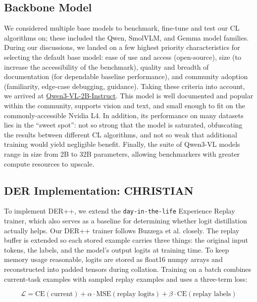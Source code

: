 \documentclass{article}
\begin{document}
\subsection{Backbone Model}
We considered multiple base models to benchmark, fine-tune and test our CL algorithms on; these included the
Qwen, SmolVLM, and Gemma model families. During our discussions, we landed on a few highest priority
characteristics for selecting the default base model: ease of use and access (open-source), size (to increase
the accessibility of the benchmark), quality and breadth of documentation (for dependable baseline
performance), and community adoption (familiarity, edge-case debugging, guidance). Taking these criteria into
account, we arrived at \href{https://huggingface.co/Qwen/Qwen3-VL-2B-Instruct}{Qwen3-VL-2B-Instruct}. This
model is well documented and popular within the community, supports vision and text, and small enough to fit
on the commonly-accessible Nvidia L4. In addition, its performance on many datasets lies in the ``sweet
spot'': not so strong that the model is saturated, obfuscating the results between different CL algorithms,
and not so weak that additional training would yield negligible benefit. Finally, the suite of Qwen3-VL
models range in size from 2B to 32B parameters, allowing benchmarkers with greater compute resources to upscale.

\subsection{DER Implementation: CHRISTIAN}
To implement DER++, we extend the \texttt{day-in-the-life} Experience Replay
trainer, which also serves as a baseline for determining whether logit
distillation actually helps. Our DER++ trainer follows Buzzega et al.
\cite{der} closely. The replay buffer is extended so each stored example
carries three things: the original input tokens, the labels, and the model's
output logits at training time. To keep memory usage reasonable, logits are
stored as float16 numpy arrays and reconstructed into padded tensors during
collation. Training on a batch combines current-task examples with sampled
replay examples and uses a three-term loss:

\begin{equation}
		\mathcal{L} = \mathrm{CE}(\text{current}) + \alpha \cdot \mathrm{MSE}(\text{replay logits}) + \beta \cdot
		\mathrm{CE}(\text{replay labels})
\end{equation}
\end{document}
